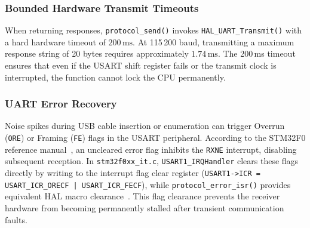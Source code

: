 \subsubsection{Bounded Hardware Transmit Timeouts}
When returning responses, \texttt{protocol\_send()} invokes \texttt{HAL\_UART\_Transmit()} with a hard hardware timeout of $200\,\text{ms}$.
At 115\,200 baud, transmitting a maximum response string of 20 bytes requires approximately $1.74\,\text{ms}$.
The 200\,ms timeout ensures that even if the USART shift register fails or the transmit clock is interrupted, the function cannot lock the CPU permanently.

\subsubsection{UART Error Recovery}
Noise spikes during USB cable insertion or enumeration can trigger Overrun (\texttt{ORE}) or Framing (\texttt{FE}) flags in the USART peripheral.
According to the STM32F0 reference manual~\cite{rm0091}, an uncleared error flag inhibits the \texttt{RXNE} interrupt, disabling subsequent reception.
In \texttt{stm32f0xx\_it.c}, \texttt{USART1\_IRQHandler} clears these flags directly by writing to the interrupt flag clear register (\texttt{USART1->ICR = USART\_ICR\_ORECF | USART\_ICR\_FECF}), while \texttt{protocol\_error\_isr()} provides equivalent HAL macro clearance~\cite{um1785}.
This flag clearance prevents the receiver hardware from becoming permanently stalled after transient communication faults.
